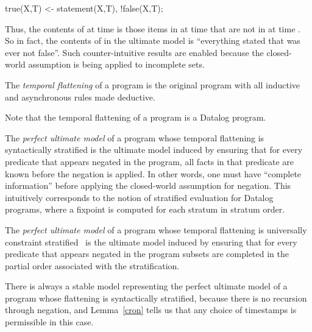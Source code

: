 \begin{Dedalus}
true(X,T) <- statement(X,T), !false(X,T);
\end{Dedalus}

Thus, the contents of  at time  is those items in  at time  that are not in  at time .  So in fact, the contents of  in the ultimate model is ``everything stated that was ever not false''.  Such counter-intuitive results are enabled because the closed-world assumption is being applied to incomplete sets.

\begin{definition}
The {\em temporal flattening} of a \lang program is the original program with all inductive and asynchronous rules made deductive.
\end{definition}

Note that the temporal flattening of a \lang program is a Datalog program.

\begin{definition}
The {\em perfect ultimate model} of a \lang program whose temporal flattening is syntactically stratified is the ultimate model induced by ensuring that for every predicate that appears negated in the program, all facts in that predicate are known before the negation is applied.  In other words, one must have ``complete information'' before applying the closed-world assumption for negation.  This intuitively corresponds to the notion of stratified evaluation for Datalog programs, where a fixpoint is computed for each stratum in stratum order.
\end{definition}

\begin{definition}
The {\em perfect ultimate model} of a \lang program whose temporal flattening is universally constraint stratified~\cite{ross-ucs} is the ultimate model induced by ensuring that for every predicate that appears negated in the program subsets are completed in the partial order associated with the stratification.
\end{definition}

There is always a stable model representing the perfect ultimate model of a \lang program whose flattening is syntactically stratified, because there is no recursion through negation, and Lemma~\ref{cron} tells us that any choice of timestamps is permissible in this case.

